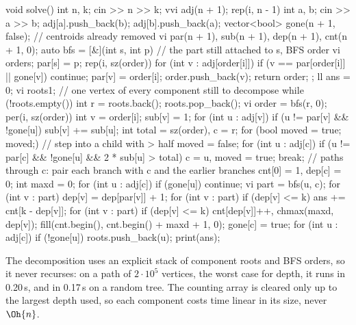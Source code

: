 \begin{code}
void solve() {
    int n, k;
    cin >> n >> k;
    vvi adj(n + 1);
    rep(i, n - 1) {
        int a, b;
        cin >> a >> b;
        adj[a].push_back(b);
        adj[b].push_back(a);
    }
    vector<bool> gone(n + 1, false);  // centroids already removed
    vi par(n + 1), sub(n + 1), dep(n + 1), cnt(n + 1, 0);
    auto bfs = [&](int s, int p) {  // the part still attached to s, BFS order
        vi order{s};
        par[s] = p;
        rep(i, sz(order)) for (int v : adj[order[i]]) {
            if (v == par[order[i]] || gone[v]) continue;
            par[v] = order[i];
            order.push_back(v);
        }
        return order;
    };
    ll ans = 0;
    vi roots{1};  // one vertex of every component still to decompose
    while (!roots.empty()) {
        int r = roots.back();
        roots.pop_back();
        vi order = bfs(r, 0);
        per(i, sz(order)) {
            int v = order[i];
            sub[v] = 1;
            for (int u : adj[v])
                if (u != par[v] && !gone[u]) sub[v] += sub[u];
        }
        int total = sz(order), c = r;
        for (bool moved = true; moved;) {  // step into a child with > half
            moved = false;
            for (int u : adj[c])
                if (u != par[c] && !gone[u] && 2 * sub[u] > total) {
                    c = u, moved = true;
                    break;
                }
        }
        // paths through c: pair each branch with c and the earlier branches
        cnt[0] = 1, dep[c] = 0;
        int maxd = 0;
        for (int u : adj[c]) {
            if (gone[u]) continue;
            vi part = bfs(u, c);
            for (int v : part) dep[v] = dep[par[v]] + 1;
            for (int v : part)
                if (dep[v] <= k) ans += cnt[k - dep[v]];
            for (int v : part)
                if (dep[v] <= k) cnt[dep[v]]++, chmax(maxd, dep[v]);
        }
        fill(cnt.begin(), cnt.begin() + maxd + 1, 0);
        gone[c] = true;
        for (int u : adj[c])
            if (!gone[u]) roots.push_back(u);
    }
    print(ans);
}
\end{code}

The decomposition uses an explicit stack of component roots and BFS orders, so it never recurses: on a path of $2 \cdot 10^5$
vertices, the worst case for depth, it runs in 0.20\,s, and in 0.17\,s on a random tree. The counting array is cleared only up to
the largest depth used, so each component costs time linear in its size, never $\Oh{n}$.


